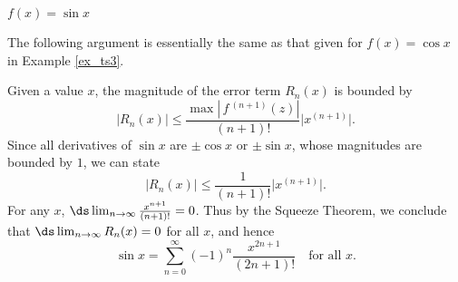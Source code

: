 {$f(x) = \sin x$
}
{The following argument is essentially the same as that given for $f(x) = \cos x$ in Example \ref{ex_ts3}.

Given a value $x$, the magnitude of the error term $R_n(x)$ is bounded by
$$ \big|R_n(x)\big| \leq \frac{\max\left|\,f\,^{(n+1)}(z)\right|}{(n+1)!}\big|x^{(n+1)}\big|.$$
Since all derivatives of $\sin x$ are $\pm \cos x$ or $\pm\sin x$, whose magnitudes are bounded by $1$, we can state
$$ \big|R_n(x)\big| \leq \frac{1}{(n+1)!}\big|x^{(n+1)}\big|.$$
For any $x$, $\ds\lim_{n\to\infty} \frac{x^{n+1}}{(n+1)!} = 0$. Thus by the Squeeze Theorem, we conclude that $\ds \lim_{n\to\infty} R_n(x) = 0$ for all $x$, and hence
$$\sin x = \sum_{n=0}^\infty (-1)^{n}\frac{x^{2n+1}}{(2n+1)!}\quad \text{for all $x$}.$$
}
